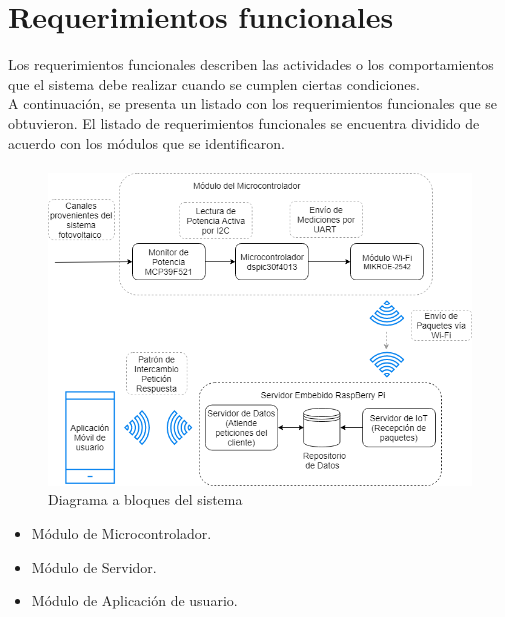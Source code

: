\section{Requerimientos funcionales}
Los requerimientos funcionales describen las actividades o los comportamientos que el sistema debe realizar cuando se cumplen ciertas condiciones.
\\
A continuación, se presenta un listado con los requerimientos funcionales que se obtuvieron.
El listado de requerimientos funcionales se encuentra dividido de acuerdo con los módulos que se identificaron.

\paragraph{}
\begin{figure}[H]
	\centering
	\includegraphics[scale=.6]{Capitulo3/img/diagramabloques.png}
	\caption{Diagrama a bloques del sistema}
	\label{fig:diagrama_dispMonitoreo}
\end{figure}

\begin{itemize}
	\item Módulo de Microcontrolador.
	\item Módulo de Servidor.
	\item Módulo de Aplicación de usuario.
\end{itemize}

